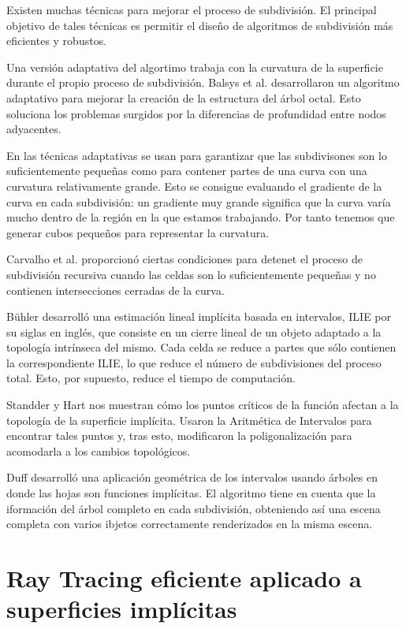 Existen muchas técnicas para mejorar el proceso de subdivisión. El principal objetivo de tales técnicas es permitir el diseño de algoritmos de subdivisión más eficientes y robustos.
\par Una versión adaptativa del algortimo trabaja con la curvatura de la superficie durante el propio proceso de subdivisión. Balsys et al. \cite{Balsys01} desarrollaron un algoritmo adaptativo para mejorar la creación de la estructura del árbol octal. Esto soluciona los problemas surgidos por la diferencias de profundidad entre nodos adyacentes.
\par En \cite{Oliveira00,Suffern03} las técnicas adaptativas se usan para garantizar que las subdivisones son lo suficientemente pequeñas como para contener partes de una curva con una curvatura relativamente grande. Esto se consigue evaluando el gradiente de la curva en cada subdivisión: un gradiente muy grande significa que la curva varía mucho dentro de la región en la que estamos trabajando. Por tanto tenemos que generar cubos pequeños para representar la curvatura.
\par Carvalho et al.\cite{Carvalho98} proporcionó ciertas condiciones para detenet el proceso de subdivisión recursiva cuando las celdas son lo suficientemente pequeñas y no contienen intersecciones cerradas de la curva.
\par Bühler\cite{Buhler02} desarrolló una estimación lineal implícita basada en intervalos, ILIE por su siglas en inglés, que consiste en un cierre lineal de un objeto adaptado a la topología intrínseca del mismo. Cada celda se reduce a partes que sólo contienen la correspondiente ILIE, lo que reduce el número de subdivisiones del proceso total. Esto, por supuesto, reduce el tiempo de computación.
\par Standder y Hart\cite{Stander97} nos muestran cómo los puntos críticos de la función afectan a la topología de la superficie implícita. Usaron la Aritmética de Intervalos para encontrar tales puntos y, tras esto, modificaron la poligonalización para acomodarla a los cambios topológicos.
\par Duff\cite{Duff92} desarrolló una aplicación geométrica de los intervalos usando árboles en donde las hojas son funciones implícitas. El algoritmo tiene en cuenta que la iformación del árbol completo en cada subdivisión, obteniendo así una escena completa con varios ibjetos correctamente renderizados en la misma escena.

\section{Ray Tracing eficiente aplicado a superficies implícitas}

